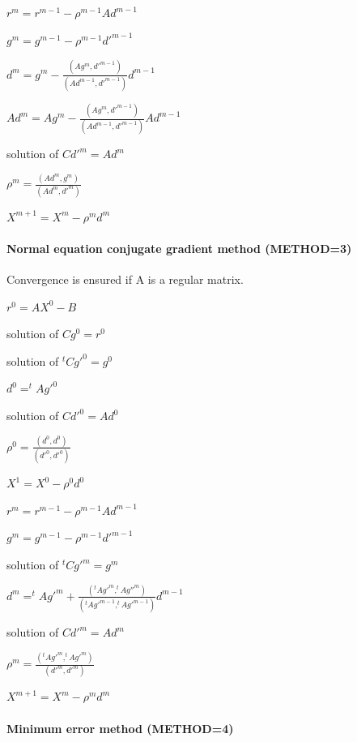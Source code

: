 
$r^{m}  =  r^{m-1}  -  \rho ^{m-1} A d^{m-1}$

$g^{m}  =  g^{m-1}  -  \rho ^{m-1} d'^{m-1}$

$d^{m} = g^{m} - \frac{(Ag^{m},d'^{m-1})}{(Ad^{m-1},d'^{m-1})} d^{m-1}$

$Ad^{m} = Ag^{m} - \frac{(Ag^{m},d'^{m-1})}{(Ad^{m-1},d'^{m-1})} Ad^{m-1}$

solution of $Cd'^{m}  =  Ad^{m}$

$\rho ^{m} = \frac{(Ad^{m},g^{m})}{(Ad^{m},d'^{m})}$

$X^{m+1}  =  X^{m}  -  \rho ^{m} d^{m}$

\paragraph{Normal equation conjugate gradient method (METHOD=3)}

Convergence is ensured if A is a regular matrix.


$r^{0}  =  A X^{0} - B$

solution of $Cg^{0}  =  r^{0}$

solution of $ ^{t}Cg'^{0} = g^{0}$

$d^{0}  =   ^{t}A g'^{0}$

solution of $Cd'^{0}  =  Ad^{0}$

$\rho ^{0} = \frac{(d^{0},d^{0})}{(d'^{0},d'^{0})}$

$X^{1} = X^{0}  -  \rho ^{0} d^{0}$


$r^{m}  =  r^{m-1}  -  \rho ^{m-1} A d^{m-1}$

$g^{m}  =  g^{m-1}  -  \rho ^{m-1} d'^{m-1}$

solution of $ ^{t}Cg'^{m} = g^{m}$

$d^{m} =  ^{t}Ag'^{m}
        + \frac{( ^{t}Ag'^{m}, ^{t}Ag''^{m})}
               {( ^{t}Ag'^{m-1}, ^{t}Ag'^{m-1})} d^{m-1}$

solution of $Cd'^{m}  =  Ad^{m}$

$\rho ^{m} = \frac{( ^{t}Ag'^{m}, ^{t}Ag'^{m})}{(d'^{m},d'^{m})}$

$X^{m+1}  =  X^{m}  -  \rho ^{m} d^{m}$

\paragraph{Minimum error method (METHOD=4)}

